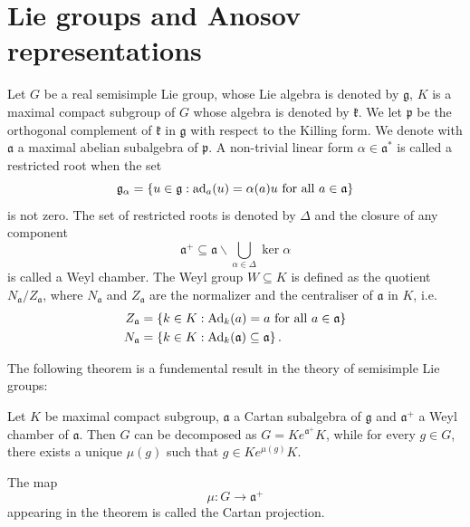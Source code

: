 \documentclass{report}
\begin{document}
\section{Lie groups and Anosov representations}\label{sec:lie_groups}
Let $G$ be a real semisimple Lie group, whose Lie algebra is denoted by $\mathfrak g$, $K$ is a maximal compact subgroup of $G$ whose algebra is denoted by $\mathfrak k$.
We let $\mathfrak p$ be the orthogonal complement of $\mathfrak k$ in $\mathfrak g$ with respect to the Killing form.
We denote with $\mathfrak a$ a maximal abelian subalgebra of $\mathfrak p$.
A non-trivial linear form $\alpha \in \mathfrak a^*$ is called a restricted root when the set
\[
\mathfrak g_\alpha = \left\{
    u \in \mathfrak g : \operatorname{ad}_a(u) = \alpha(a) u \text{ for all } a \in \mathfrak a
\right\}
\] 
is not zero.
The set of restricted roots is denoted by $\Delta$ and the closure of any component
\[
\mathfrak a^+ \subseteq \mathfrak a \backslash \bigcup_{\alpha \in \Delta} \ker \alpha
\]
is called a Weyl chamber.
The Weyl group $W \subseteq K$ is defined as the quotient $N_{\mathfrak a}/Z_{\mathfrak a}$, where $N_{\mathfrak a}$ and $Z_{\mathfrak a}$ are the normalizer and the centraliser of $\mathfrak a$ in $K$, i.e.
\begin{align*}
    Z_{\mathfrak a} &= \left\{ k \in K: \operatorname{Ad}_k(a) = a \text{ for all } a \in \mathfrak a \right\}\\
    N_{\mathfrak a} &= \left\{ k \in K: \operatorname{Ad}_k(\mathfrak a) \subseteq \mathfrak a \right\}.
\end{align*}


The following theorem is a fundemental result in the theory of semisimple Lie groups:
\begin{theorem}
Let $K$ be maximal compact subgroup, $\mathfrak a$ a Cartan subalgebra  of $\mathfrak g$ and $\mathfrak a^+$ a Weyl chamber of $\mathfrak a$.
Then $G$ can be decomposed as $G = K e^{\mathfrak a^+} K$, while for every $g \in G$, there exists a unique $\mu(g)$ such that $g \in K e^{\mu(g)} K$.    
\end{theorem}

The map
\[
\mu: G \to \mathfrak a^+
\] 
appearing in the theorem is called the Cartan projection.
\end{document}
